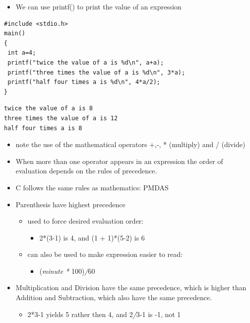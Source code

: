 \documentclass{beamer}
\begin{document}
\begin{frame}[fragile]
\begin{itemize}
\item We can use printf() to print the value of an expression
\end{itemize}
\begin{block}{}
\begin{lstlisting}
#include <stdio.h>
main()
{
 int a=4;
 printf("twice the value of a is %d\n", a+a);
 printf("three times the value of a is %d\n", 3*a);
 printf("half four times a is %d\n", 4*a/2);
}
\end{lstlisting}
\end{block}

\begin{block}{}
\begin{lstlisting}
twice the value of a is 8
three times the value of a is 12
half four times a is 8
\end{lstlisting}
\end{block}
\end{frame}

\begin{frame}[fragile]
\begin{itemize}
\item note the use of the mathematical operators +,-, * (multiply) and / (divide)
\end{itemize}


\end{frame}


\begin{frame}
\begin{itemize}
\item When more than one operator appears in an expression the order of evaluation depends on the
\textcolor[rgb]{0.26666668,0.0,0.5176471}{rules of precedence}. 
\item C follows the same rules as mathematics: PMDAS 

\item Parenthesis have highest precedence

\begin{itemize}
\item used to force desired evaluation order: 
\begin{itemize}
\item 2*(3-1) is 4, and (1 + 1)*(5-2) is 6
\end{itemize}
\item can also be used to make expression easier to read:
\begin{itemize}
\item (\textit{minute * }100)\textit{/}60 
\end{itemize}
\end{itemize}
\item Multiplication and Division have the same precedence, which is higher than Addition and Subtraction, which also have the same precedence. 
\begin{itemize}
\item 2*3-1 yields 5 rather then 4, and 2\textit{/}3-1 is -1, not 1 
\end{itemize}
\end{itemize}
\end{frame}
\end{document}
